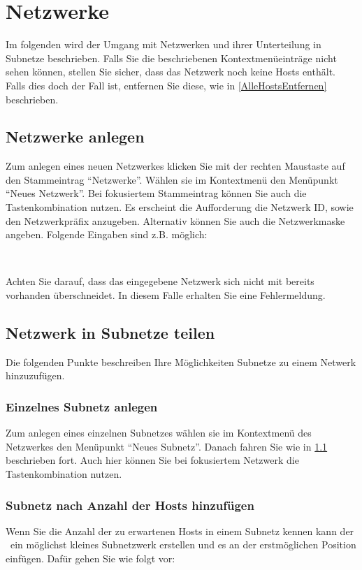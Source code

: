 \section{Netzwerke}
Im folgenden wird der Umgang mit Netzwerken und ihrer Unterteilung in Subnetze
beschrieben.
Falls Sie die beschriebenen Kontextmenüeinträge nicht sehen können, stellen Sie sicher,
dass das Netzwerk noch keine Hosts enthält. Falls dies doch der Fall ist, entfernen Sie
diese, wie in \ref{AlleHostsEntfernen} beschrieben.

\subsection{Netzwerke anlegen}
\label{NetzwerkAnlegen}
Zum anlegen eines neuen Netzwerkes klicken Sie mit der rechten Maustaste auf den
Stammeintrag "`Netzwerke"'. Wählen sie im Kontextmenü den Menüpunkt
"`Neues Netzwerk"'. Bei fokusiertem Stammeintrag können Sie auch die
Tastenkombination  nutzen.
Es erscheint die Aufforderung die Netzwerk ID, sowie den Netzwerkpräfix anzugeben.
Alternativ können Sie auch die Netzwerkmaske angeben. Folgende Eingaben sind z.B.
möglich:

\\

Achten Sie darauf, dass das eingegebene Netzwerk sich nicht mit bereits vorhanden
überschneidet. In diesem Falle erhalten Sie eine Fehlermeldung.

\subsection{Netzwerk in Subnetze teilen}
Die folgenden Punkte beschreiben Ihre Möglichkeiten Subnetze zu einem Netwerk
hinzuzufügen.

\subsubsection{Einzelnes Subnetz anlegen}
Zum anlegen eines einzelnen Subnetzes wählen sie im Kontextmenü des Netzwerkes den
Menüpunkt "`Neues Subnetz"'. Danach fahren Sie wie in \ref{NetzwerkAnlegen}
beschrieben fort.
Auch hier können Sie bei fokusiertem Netzwerk die Tastenkombination 
nutzen.

\subsubsection{Subnetz nach Anzahl der Hosts hinzufügen}
Wenn Sie die Anzahl der zu erwartenen Hosts in einem Subnetz kennen kann der
\subnetcalc\ ein möglichst kleines Subnetzwerk erstellen und es an der erstmöglichen
Position einfügen. Dafür gehen Sie wie folgt vor:

